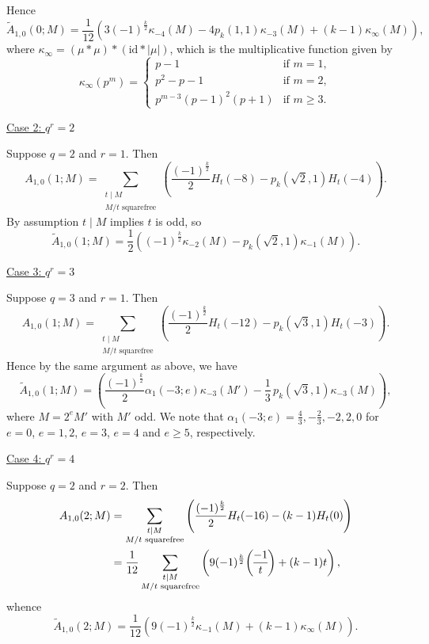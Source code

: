 \documentclass[11pt]{amsart}
\newcommand{\leg}{\overwithdelims ()}
\numberwithin{lem}{section}
\theoremstyle{remark}
\theoremstyle{definition}
\numberwithin{equation}{section}
\begin{document}
Hence
\begin{equation} \tilde A_{1,0}(0; M) =  \frac 1{12} \left( 3(-1)^{\frac k2} \kappa_{-4}(M) -
4 p_k(1,1) \kappa_{-3}(M) + (k-1) \kappa_\infty(M) \right), 
\end{equation}
where $\kappa_\infty = (\mu * \mu) * (\textrm{id} * |\mu|)$, which is the multiplicative function given by
\begin{equation} \label{eq:kapinfty}
 \kappa_\infty(p^m) = 
\begin{cases}
p-1 & \text{if }m = 1, \\
p^2 - p - 1 & \text{if }m = 2, \\
p^{m-3} (p-1)^2 (p+1) & \text{if }m \ge 3. 
\end{cases} 
\end{equation}

\medskip
\noindent
\underline{Case 2: $q^r = 2$}

Suppose $q=2$ and $r=1$.  Then
\[ A_{1,0}(1; M) = \sum_{\substack{t \mid M \\ M/t \text{ squarefree}}} 
\left( \frac{(-1)^{\frac k2}}2 H_t(-8) -  p_k(\sqrt 2,1) H_t(-4) \right). \]
By assumption $t \mid M$ implies $t$ is odd, so
\begin{equation} \tilde A_{1,0}(1; M) =  \frac 1{2} \left( (-1)^{\frac k2} \kappa_{-2}(M) -  p_k(\sqrt 2,1) \kappa_{-1}(M) \right). 
\end{equation}

\medskip
\noindent
\underline{Case 3: $q^r = 3$}

Suppose $q=3$ and $r=1$.  Then
\[ A_{1,0}(1; M) = \sum_{\substack{t \mid M \\ M/t \text{ squarefree}}} 
\left( \frac{(-1)^{\frac k2}}2 H_t(-12) -  p_k(\sqrt 3,1) H_t(-3) \right). \]
Hence by the same argument as above, we have
\begin{equation}
\tilde A_{1,0}(1; M) =  \left( \frac{(-1)^{\frac k2}}2 \alpha_1(-3;e) \kappa_{-3}(M') -  \frac 13 \, p_k(\sqrt 3,1) \kappa_{-3}(M) \right),
\end{equation}
where $M = 2^e M'$ with $M'$ odd.  We note that
$\alpha_1(-3; e) = \frac 43, -\frac 23, -2, 2, 0$ for $e = 0$, $e= 1,2$,
$e = 3$, $e=4$ and $e\ge 5$, respectively.

\medskip
\noindent
\underline{Case 4: $q^r = 4$}

Suppose $q=2$ and $r=2$.  Then
\begin{align*} A_{1,0}(2; M) &= \sum_{\substack{t \mid M \\ M/t \text{ squarefree}}} 
\left( \frac{(-1)^{\frac k2}}2 H_t(-16) -  (k-1) H_t(0) \right) \\
&= \frac 1{12} \sum_{\substack{t \mid M \\ M/t \text{ squarefree}}} 
\left( 9 {(-1)^{\frac k2}} {-1 \leg t} +  (k-1) t \right),
\end{align*}
whence
\begin{equation}
\tilde A_{1,0}(2; M) = \frac 1{12}  
\left( 9 {(-1)^{\frac k2}} \kappa_{-1}(M) +  (k-1) \kappa_\infty(M) \right).
\end{equation}
\end{document}
